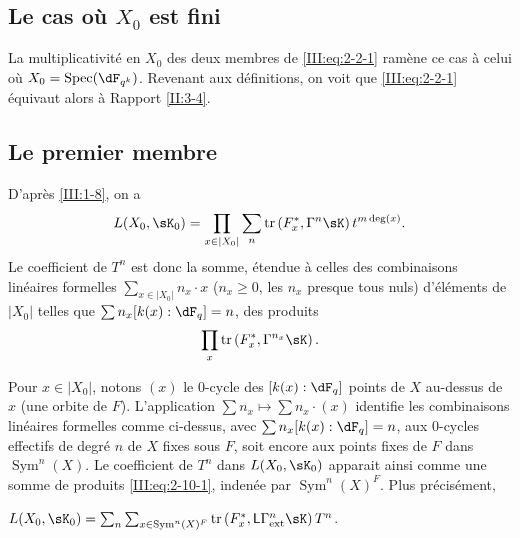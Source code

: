 \subsection{Le cas où $X_0$ est fini}\label{III:2-9}

La multiplicativité en $X_0$ des deux membres de \eqref{III:eq:2-2-1} 
ramène ce cas à celui où $X_0=\spec(\dF_{q^k})$. Revenant aux 
définitions, on voit que \eqref{III:eq:2-2-1} équivaut alors à 
Rapport \ref{II:3-4}. 





\subsection{Le premier membre}\label{III:2-10}

D'après \ref{III:1-8}, on a 
\[
  L(X_0,\sK_0) = \prod_{x\in |X_0|} \sum_n \tr\left(F_x^*,\Gamma^n\sK\right) t^{m\deg(x)} \text{.}
\]
Le coefficient de $T^n$ est donc la somme, étendue à celles des 
combinaisons linéaires formelles $\sum_{x\in |X_0|} n_x\cdot x$ 
($n_x\geqslant 0$, les $n_x$ presque tous nuls) d'éléments de $|X_0|$ 
telles que $\sum n_x [k(x):\dF_q] = n$, des produits 
\begin{equation}\label{III:eq:2-10-1}
  \prod_x \tr\left(F_x^*,\Gamma^{n_x} \sK\right) \text{.}
\end{equation}

Pour $x\in |X_0|$, notons $(x)$ le $0$-cycle des $[k(x):\dF_q]$ points de $X$ 
au-dessus de $x$ (une orbite de $F$). L'application 
$\sum n_x\mapsto \sum n_x\cdot (x)$ identifie les combinaisons linéaires 
formelles comme ci-dessus, avec $\sum n_x [k(x):\dF_q]=n$, aux $0$-cycles 
effectifs de degré $n$ de $X$ fixes sous $F$, soit encore aux points fixes de 
$F$ dans $\operatorname{Sym}^n(X)$. Le coefficient de $T^n$ dans $L(X_0,\sK_0)$ 
apparait ainsi comme une somme de produits \eqref{III:eq:2-10-1}, indenée 
par $\operatorname{Sym}^n(X)^F$. Plus précisément, 





\begin{lemma_}\label{III:2-11}
 $L(X_0,\sK_0) = \sum_n \sum_{x\in\operatorname{Sym}^n(X)^F} \tr\left(F_x^*,\eL\Gamma_\textnormal{ext}^n \sK\right) T^n$.
\end{lemma_}

